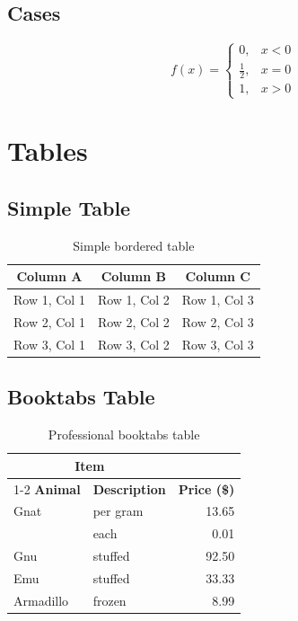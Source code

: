 \documentclass[12pt,a4paper]{article}
\begin{document}
\subsection{Cases}

\begin{equation}
  f(x) = \begin{cases}
    0, & x < 0 \\
    \frac{1}{2}, & x = 0 \\
    1, & x > 0
  \end{cases}
  \label{eq:cases}
\end{equation}

\section{Tables}
\label{sec:tables}

\subsection{Simple Table}

\begin{table}[H]
\centering
\begin{tabular}{|c|c|c|}
\hline
\textbf{Column A} & \textbf{Column B} & \textbf{Column C} \\
\hline
Row 1, Col 1 & Row 1, Col 2 & Row 1, Col 3 \\
\hline
Row 2, Col 1 & Row 2, Col 2 & Row 2, Col 3 \\
\hline
Row 3, Col 1 & Row 3, Col 2 & Row 3, Col 3 \\
\hline
\end{tabular}
\caption{Simple bordered table}
\label{tab:simple}
\end{table}

\subsection{Booktabs Table}

\begin{table}[H]
\centering
\begin{tabular}{@{}llr@{}}
\toprule
\multicolumn{2}{c}{\textbf{Item}} & \\
\cmidrule(r){1-2}
\textbf{Animal} & \textbf{Description} & \textbf{Price (\$)} \\
\midrule
Gnat      & per gram   & 13.65 \\
          & each       &  0.01 \\
Gnu       & stuffed    & 92.50 \\
Emu       & stuffed    & 33.33 \\
Armadillo & frozen     &  8.99 \\
\bottomrule
\end{tabular}
\caption{Professional booktabs table}
\label{tab:booktabs}
\end{table}
\end{document}
